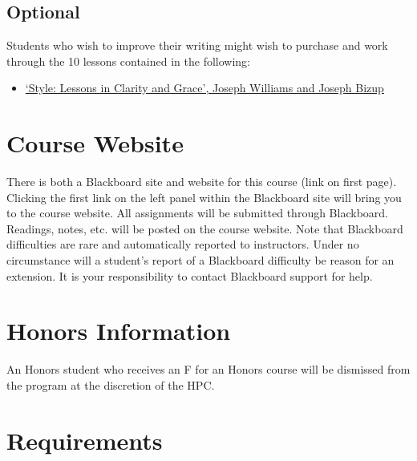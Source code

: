 \documentclass[article,oneside]{memoir}
\begin{document}
\subsection{Optional}
Students who wish to improve their writing might wish to purchase and work through the 10 lessons contained in the following: 
\begin{itemize}
\item \href{http://www.amazon.com/Style-Lessons-Clarity-Grace-11th/dp/0321898680/ref=sr_1_1?ie=UTF8&qid=1452356026&sr=8-1&keywords=lessons+in+clarity+and+grace}{`Style: Lessons in Clarity and Grace', Joseph Williams and Joseph Bizup}
\end{itemize}

\section{Course Website}
There is both a Blackboard site and website for this course (link on first page). Clicking the first link on the left panel within the Blackboard site will bring you to the course website. All assignments will be submitted through Blackboard. Readings, notes, etc. will be posted on the course website. Note that Blackboard difficulties are rare and automatically reported to instructors. Under no circumstance will a student's report of a Blackboard difficulty be reason for an extension. It is your responsibility to contact Blackboard support for help.

\section{Honors Information}
An Honors student who receives an F for an Honors course will be dismissed from the program at the discretion of the HPC.

\section{Requirements}
\end{document}
